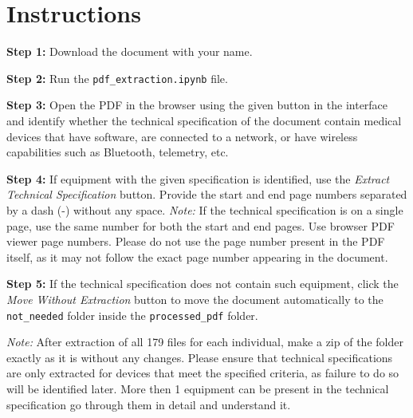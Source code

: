 \documentclass[14pt]{extarticle} %
\begin{document}
	
	\section*{Instructions}
	
	\textbf{Step 1:} Download the document with your name.
	
	\textbf{Step 2:} Run the \texttt{pdf\_extraction.ipynb} file.
	
	\textbf{Step 3:} Open the PDF in the browser using the given button in the interface and identify whether the technical specification of the document contain medical devices that have software, are connected to a network, or have wireless capabilities such as Bluetooth, telemetry, etc.
	
	\textbf{Step 4:} If equipment with the given specification is identified, use the \textit{Extract Technical Specification} button. Provide the start and end page numbers separated by a dash (-) without any space. \textit{Note:} If the technical specification is on a single page, use the same number for both the start and end pages. Use browser PDF viewer page numbers. Please do not use the page number present in the PDF itself, as it may not follow the exact page number appearing in the document.
	
	\textbf{Step 5:} If the technical specification does not contain such equipment, click the \textit{Move Without Extraction} button to move the document automatically to the \texttt{not\_needed} folder inside the \texttt{processed\_pdf} folder.

	\vspace{1cm}
	\textit{Note:} After extraction of all 179 files for each individual, make a zip of the folder exactly as it is without any changes. Please ensure that technical specifications are only extracted for devices that meet the specified criteria, as failure to do so will be identified later. More then 1 equipment can be present in the technical specification go through them in detail and understand it.
	
\end{document}
